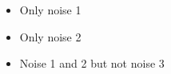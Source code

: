 \documentclass[a4paper]{scrartcl}
\begin{document}
\begin{enumerate}
\begin{itemize}
				\item Only noise 1
				
				\item Only noise 2
				
				\item Noise 1 and 2 but not noise 3
			\end{itemize}
		
		
		
	\end{enumerate}
\end{document}
